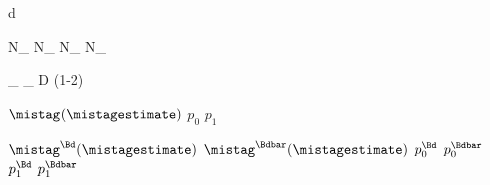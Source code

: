 
\newmathsymbol{\tagdecision}     {d}
\newmathsymbol{\tg}              {\tagdecision}
\newmathsymbol{\mistagestimate}  {\eta}
\newmathsymbol{\deltamistagestimate}{\Delta\mistagestimate}
\newmathsymbol{\mistag}          {\omega}
\newmathsymbol{\deltamistag}     {\Delta\mistag}

\newmathsymbol{\Ntagged}         {N_}
\newmathsymbol{\NRtagged}        {N_}
\newmathsymbol{\NWtagged}        {N_}
\newmathsymbol{\NUtagged}        {N_}

\newmathsymbol{\tageff}          {\eps_}
\newmathsymbol{\efftageff}       {\eps_}
\newmathsymbol{\tagdilution}     {D}
\newmathsymbol{\tagdilutionlg}   {(1-2\mistag)}

\newcommand{\p}[2]                {\ensuremath{p_{#1}^{#2}}\xspace}
\newcommand{\deltap}[2]           {\ensuremath{\Delta p_{#1}^{#2}}\xspace}
\newcommand{\omegaofeta}[1]       {\ensuremath{\mistag^{#1}(\mistagestimate)}\xspace}
\newmathsymbol{\omofeta}          {\omegaofeta{}}
\newmathsymbol{\pzero}            {\p{0}{}}
\newmathsymbol{\deltapzero}       {}
\newmathsymbol{\pone}             {\p{1}{}}
\newmathsymbol{\deltapone}        {}
\newmathsymbol{\avgmistagestimate}{\langle\mistagestimate\rangle}

\newmathsymbol{\omofetaBd}        {\omegaofeta{\Bd}}
\newmathsymbol{\omofetaBdbar}     {\omegaofeta{\Bdbar}}
\newmathsymbol{\pzeroBd}          {\p{0}{\Bd}}
\newmathsymbol{\pzeroBdbar}       {\p{0}{\Bdbar}}
\newmathsymbol{\poneBd}           {\p{1}{\Bd}}
\newmathsymbol{\poneBdbar}        {\p{1}{\Bdbar}}


